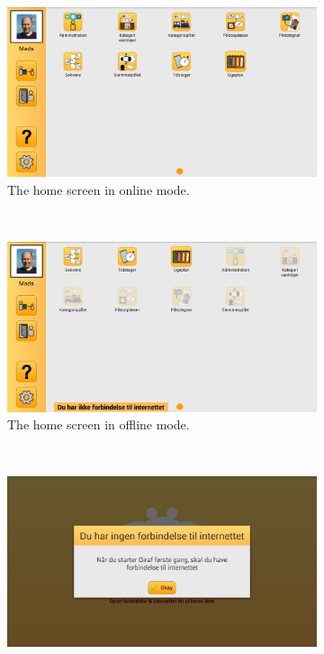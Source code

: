 \begin{figure}[h]
    \centering
    \begin{subfigure}[t]{0.47\textwidth}
        \includegraphics[width=\textwidth]{figures/img/screenshots/reg_homescreen.png}
        \caption{The home screen in online mode.}\label{fig:online_homescreen}
    \end{subfigure}%
    ~
    \begin{subfigure}[t]{0.47\textwidth}
        \includegraphics[width=\textwidth]{figures/img/screenshots/offline_homescreen.png}
        \caption{The home screen in offline mode.}\label{fig:offline_homescreen}
    \end{subfigure}
    \\
    \begin{subfigure}[t]{0.47\textwidth}
        \includegraphics[width=\textwidth]{figures/img/screenshots/offline_initstart.png}

\end{subfigure}
\end{figure}
